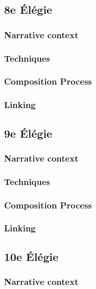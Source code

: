 \documentclass[12pt,twoside,maitrise]{dms}
\theoremstyle{definition}
\begin{document}
\subsection{8e Élégie}

\subsubsection{Narrative context}

\subsubsection{Techniques}

\subsubsection{Composition Process}

\subsubsection{Linking}

\subsection{9e Élégie}

\subsubsection{Narrative context}

\subsubsection{Techniques}

\subsubsection{Composition Process}

\subsubsection{Linking}

\subsection{10e Élégie}

\subsubsection{Narrative context}
\end{document}
